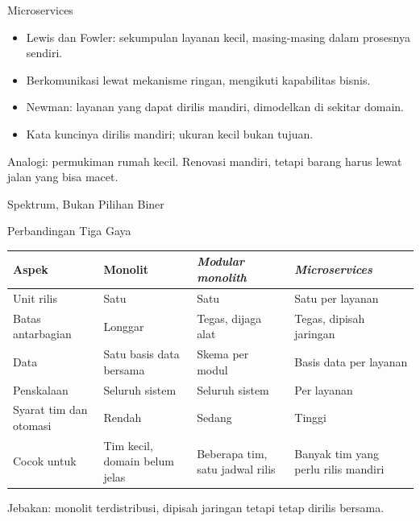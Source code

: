 \documentclass[aspectratio=169, table, 12pt]{beamer}
\begin{document}
\begin{frame}{{\Large Microservices}}
  \vspace{10pt}
  \begin{itemize}
    \item Lewis dan Fowler: sekumpulan layanan kecil, masing-masing dalam prosesnya sendiri.
    \item Berkomunikasi lewat mekanisme ringan, mengikuti kapabilitas bisnis.
    \item Newman: layanan yang dapat dirilis mandiri, dimodelkan di sekitar domain.
    \item Kata kuncinya dirilis mandiri; ukuran kecil bukan tujuan.
  \end{itemize}
  \vspace{6pt}
  {\small Analogi: permukiman rumah kecil. Renovasi mandiri, tetapi barang harus lewat jalan
  yang bisa macet.}
\end{frame}

\begin{frame}{{\Large Spektrum, Bukan Pilihan Biner}}
  \centering
\end{frame}

\begin{frame}{{\Large Perbandingan Tiga Gaya}}
  \footnotesize
  \begin{tabularx}{\textwidth}{>{\raggedright\arraybackslash}p{2.8cm}
      >{\raggedright\arraybackslash}X >{\raggedright\arraybackslash}X
      >{\raggedright\arraybackslash}X}
    \hline
    \textbf{Aspek} & \textbf{Monolit} & \textbf{\textit{Modular monolith}} &
      \textbf{\textit{Microservices}} \\
    \hline
    Unit rilis & Satu & Satu & Satu per layanan \\
    \hline
    Batas antarbagian & Longgar & Tegas, dijaga alat & Tegas, dipisah jaringan \\
    \hline
    Data & Satu basis data bersama & Skema per modul & Basis data per layanan \\
    \hline
    Penskalaan & Seluruh sistem & Seluruh sistem & Per layanan \\
    \hline
    Syarat tim dan otomasi & Rendah & Sedang & Tinggi \\
    \hline
    Cocok untuk & Tim kecil, domain belum jelas & Beberapa tim, satu jadwal rilis & Banyak
      tim yang perlu rilis mandiri \\
    \hline
  \end{tabularx}

  \vspace{8pt}
  \small Jebakan: monolit terdistribusi, dipisah jaringan tetapi tetap dirilis bersama.
\end{frame}
\end{document}
